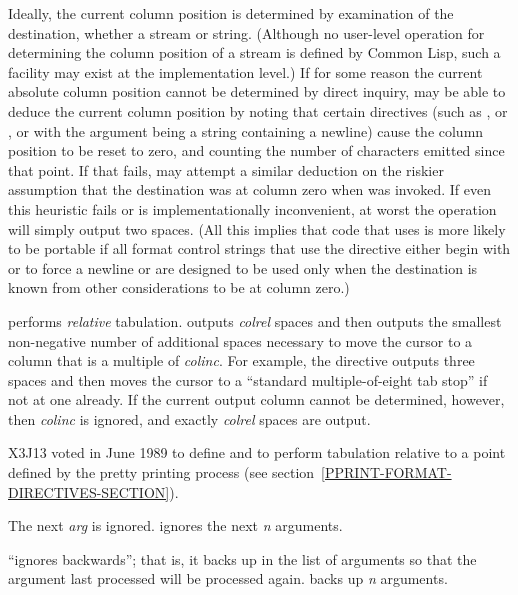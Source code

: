 \begin{flushdesc}
Ideally, the current column position is determined by examination of the
destination, whether a stream or string. (Although no user-level
operation for determining the column position of a stream is defined
by Common Lisp, such a facility may exist at the implementation level.)
If for some reason the current absolute column position cannot be determined
by direct inquiry,
 may be able to deduce the current column position by noting
that certain directives (such as \cd{{\Xtilde}\%}, or \cd{{\Xtilde}\&},
or  with the argument being a string containing a newline) cause
the column position to be reset to zero, and counting the number of characters
emitted since that point.  If that fails,  may attempt a
similar deduction on the riskier assumption that the destination was
at column zero when  was invoked.  If even this heuristic fails
or is implementationally inconvenient, at worst
the  operation will simply output two spaces.
(All this implies that code that uses  is
more likely to be portable if all format control strings that use 
the  directive either begin with \cd{{\Xtilde}\%} or \cd{{\Xtilde}\&}
to force a newline
or are designed to be used only when the destination is known from other
considerations to be at column zero.)

 performs {\it relative} tabulation.
 outputs {\it colrel} spaces
and then outputs the smallest non-negative
number of additional spaces necessary to move the cursor
to a column that is a multiple
of {\it colinc}.  For example, the directive  outputs
three spaces and then moves the cursor to a ``standard multiple-of-eight
tab stop'' if not at one already.
If the current output column cannot be determined, however,
then {\it colinc} is ignored, and exactly {\it colrel} spaces are output.

\begin{new}
X3J13 voted in June 1989  to define 
and  to perform tabulation relative to a point defined
by the pretty printing process (see section~\ref{PPRINT-FORMAT-DIRECTIVES-SECTION}).
\end{new}

\item[\cd{{\Xtilde}*}]
The next {\it arg} is ignored.   ignores the next {\it n} arguments.

\cd{{\Xtilde}:*} ``ignores backwards''; that is, it backs up in the list of
arguments so that the argument last processed will be processed again.
 backs up {\it n} arguments.


\end{flushdesc}
